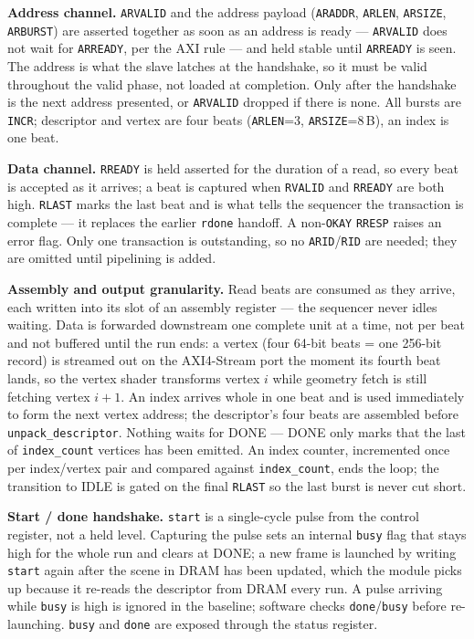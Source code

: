 \documentclass[11pt,a4paper]{article}
\newcommand{\field}[1]{\textbf{#1}\quad}
\begin{document}
\field{Address channel.} \texttt{ARVALID} and the address payload
(\texttt{ARADDR}, \texttt{ARLEN}, \texttt{ARSIZE}, \texttt{ARBURST}) are asserted
together as soon as an address is ready --- \texttt{ARVALID} does not wait for
\texttt{ARREADY}, per the AXI rule --- and held stable until \texttt{ARREADY} is
seen. The address is what the slave latches at the handshake, so it must be
valid throughout the valid phase, not loaded at completion. Only after the
handshake is the next address presented, or \texttt{ARVALID} dropped if there is
none. All bursts are \texttt{INCR}; descriptor and vertex are four beats
(\texttt{ARLEN}=3, \texttt{ARSIZE}=8\,B), an index is one beat.

\field{Data channel.} \texttt{RREADY} is held asserted for the duration of a
read, so every beat is accepted as it arrives; a beat is captured when
\texttt{RVALID} and \texttt{RREADY} are both high. \texttt{RLAST} marks the last
beat and is what tells the sequencer the transaction is complete --- it replaces
the earlier \texttt{rdone} handoff. A non-\texttt{OKAY} \texttt{RRESP} raises an
error flag. Only one transaction is outstanding, so no \texttt{ARID}/\texttt{RID}
are needed; they are omitted until pipelining is added.

\field{Assembly and output granularity.} Read beats are consumed as they arrive,
each written into its slot of an assembly register --- the sequencer never
idles waiting. Data is forwarded downstream one complete unit at a time, not per
beat and not buffered until the run ends: a vertex (four 64-bit beats = one
256-bit record) is streamed out on the AXI4-Stream port the moment its fourth
beat lands, so the vertex shader transforms vertex $i$ while geometry fetch is
still fetching vertex $i{+}1$. An index arrives whole in one beat and is used
immediately to form the next vertex address; the descriptor's four beats are
assembled before \texttt{unpack\_descriptor}. Nothing waits for DONE ---
DONE only marks that the last of \texttt{index\_count} vertices has been emitted.
An index counter, incremented once per index/vertex pair and compared against
\texttt{index\_count}, ends the loop; the transition to IDLE is gated on the
final \texttt{RLAST} so the last burst is never cut short.

\field{Start / done handshake.} \texttt{start} is a single-cycle pulse from the
control register, not a held level. Capturing the pulse sets an internal
\texttt{busy} flag that stays high for the whole run and clears at DONE; a new
frame is launched by writing \texttt{start} again after the scene in DRAM has
been updated, which the module picks up because it re-reads the descriptor from
DRAM every run. A pulse arriving while \texttt{busy} is high is ignored in the
baseline; software checks \texttt{done}/\texttt{busy} before re-launching.
\texttt{busy} and \texttt{done} are exposed through the status register.
\end{document}
